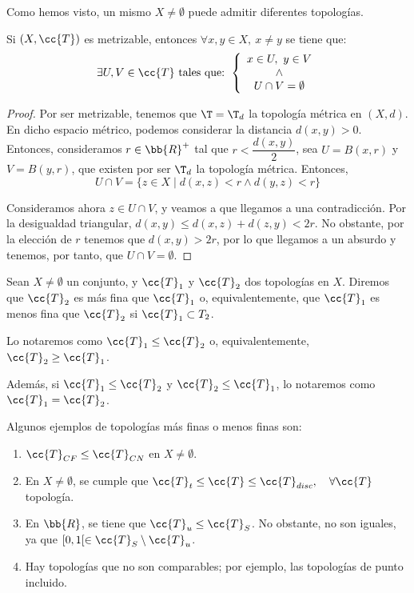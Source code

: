 Como hemos visto, un mismo $X\neq \emptyset$ puede admitir diferentes topologías.


\begin{lema}\label{lema:Metrizable}
    Si $(X,\cc{T})$ es metrizable, entonces $\forall x,y\in X,~x\neq y$ se tiene que:
    \begin{equation*}
        \exists U,V\in \cc{T} \text{ tales que: }
        \left\{
        \begin{array}{c}
            x\in U,~y\in V\\
            \land\\
            U\cap V=\emptyset
        \end{array}
        \right.
    \end{equation*}
\end{lema}
\begin{proof}
    Por ser metrizable, tenemos que $\T=\T_d$ la topología métrica en $(X,d)$. En dicho espacio métrico, podemos considerar la distancia $d(x,y)>0$. Entonces, consideramos $r\in \bb{R}^+$ tal que $r<\dfrac{d(x,y)}{2}$, sea $U=B(x,r)$ y $V=B(y,r)$, que existen por ser $\T_d$ la topología métrica. Entonces,
    $$U\cap V = \{z\in X\mid d(x,z)<r \land d(y,z)<r\}$$

    Consideramos ahora $z\in U\cap V$, y veamos a que llegamos a una contradicción. Por la desigualdad triangular, $d(x,y)\leq d(x,z) + d(z,y)<2r$. No obstante, por la elección de $r$ tenemos que $d(x,y)>2r$, por lo que llegamos a un absurdo y tenemos, por tanto, que $U\cap V=\emptyset$.
\end{proof}


\begin{definicion}
    Sean $X\neq \emptyset$ un conjunto, y $\cc{T}_1$ y $\cc{T}_2$ dos topologías en $X$. Diremos que $\cc{T}_2$ es más fina que $\cc{T}_1$ o, equivalentemente, que $\cc{T}_1$ es menos fina que $\cc{T}_2$ si $\cc{T}_1\subset T_2$.

    Lo notaremos como $\cc{T}_1\leq \cc{T}_2$ o, equivalentemente, $\cc{T}_2\geq \cc{T}_1$.

    Además, si $\cc{T}_1\leq \cc{T}_2$ y $\cc{T}_2\leq \cc{T}_1$, lo notaremos como $\cc{T}_1=\cc{T}_2$.
\end{definicion}
\begin{ejemplo}
    Algunos ejemplos de topologías más finas o menos finas son:
    \begin{enumerate}
        \item $\cc{T}_{CF}\leq \cc{T}_{CN}$ en $X\neq \emptyset$.
        \item En $X\neq \emptyset$, se cumple que $\cc{T}_t\leq \cc{T}\leq \cc{T}_{disc},\quad \forall \cc{T}$ topología.
        \item En $\bb{R}$, se tiene que $\cc{T}_u\leq \cc{T}_S$. No obstante, no son iguales, ya que $[0,1[\in \cc{T}_S\setminus \cc{T}_u$.
        \item Hay topologías que no son comparables; por ejemplo, las topologías de punto incluido.
    \end{enumerate}
\end{ejemplo}



